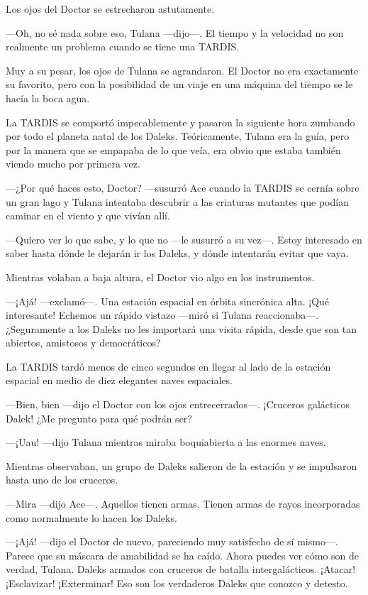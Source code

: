 Los ojos del Doctor se estrecharon astutamente.

---Oh, no sé nada sobre eso, Tulana ---dijo---. El tiempo y la
velocidad no son realmente un problema cuando se tiene una TARDIS.

Muy a su pesar, los ojos de Tulana se agrandaron. El Doctor no
era exactamente su favorito, pero con la posibilidad de un viaje en una
máquina del tiempo se le hacía la boca agua.

La TARDIS se comportó impecablemente y pasaron la siguiente hora
zumbando por todo el planeta natal de los Daleks. Teóricamente, Tulana
era la guía, pero por la manera que se empapaba de lo que veía, era
obvio que estaba también viendo mucho por primera vez.

---¿Por qué haces esto, Doctor? ---susurró Ace cuando la TARDIS
se cernía sobre un gran lago y Tulana intentaba descubrir a las
criaturas mutantes que podían caminar en el viento y que vivían allí.

---Quiero ver lo que sabe, y lo que no ---le susurró a su
vez---. Estoy interesado en saber hasta dónde le dejarán ir los Daleks,
y dónde intentarán evitar que vaya.

Mientras volaban a baja altura, el Doctor vio algo en los
instrumentos.

---¡Ajá! ---exclamó---. Una estación espacial en órbita
sincrónica alta. ¡Qué interesante! Echemos un rápido vistazo ---miró si
Tulana reaccionaba---. ¿Seguramente a los Daleks no les importará una
visita rápida, desde que son tan abiertos, amistosos y democráticos?

La TARDIS tardó menos de cinco segundos en llegar al lado de la
estación espacial en medio de diez elegantes naves espaciales.

---Bien, bien ---dijo el Doctor con los ojos entrecerrados---.
¡Cruceros galácticos Dalek! ¿Me pregunto para qué podrán ser?

---¡Uau! ---dijo Tulana mientras miraba boquiabierta a las
enormes naves.

Mientras observaban, un grupo de Daleks salieron de la estación
y se impulsaron hasta uno de los cruceros.

---Mira ---dijo Ace---. Aquellos tienen armas. Tienen armas de
rayos incorporadas como normalmente lo hacen los Daleks.

---¡Ajá! ---dijo el Doctor de nuevo, pareciendo muy satisfecho
de sí mismo---. Parece que su máscara de amabilidad se ha caído. Ahora
puedes ver cómo son de verdad, Tulana. Daleks armados con cruceros de
batalla intergalácticos. ¡Atacar! ¡Esclavizar! ¡Exterminar! Eso son los
verdaderos Daleks que conozco y detesto.

